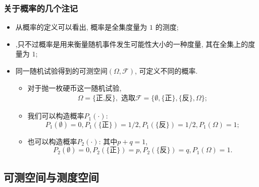 \documentclass[Prob-All.tex]{subfiles}
\begin{document}
\begin{frame}
	\frametitle{关于概率的几个注记}
	\begin{itemize}[<+-|alert@+>]
		\item 从概率的定义可以看出, 概率是全集度量为 $1$ 的测度;
		\item {},只不过概率是用来衡量随机事件发生可能性大小的一种度量, 其在全集上的度量为 $1$;
		\item 同一随机试验得到的可测空间$(\Omega,\mathcal{F})$, 可定义不同的概率.
		\begin{itemize}[<+-|alert@+>]
			\item 对于抛一枚硬币这一随机试验,
			\begin{eqnarray*}
				\Omega=\{\mbox{正,反}\}, \mbox{ 选取} \mathcal{F}=\{\emptyset, \{\mbox{正}\}, \{\mbox{反}\}, \Omega\};
			\end{eqnarray*}
			\item 我们可以构造概率$P_1(\cdot)$:
			\[P_1(\emptyset)=0, P_1(\{\mbox{正}\})=1/2,  P_1(\{\mbox{反}\})=1/2,  P_1(\Omega)=1;\]
			\item 也可以构造概率$P_2(\cdot)$: 其中$p+q=1$,
			\[P_2(\emptyset)=0, P_2(\{\mbox{正}\})=p,  P_2(\{\mbox{反}\})=q,  P_1(\Omega)=1.\]
		\end{itemize}

	\end{itemize}
\end{frame}





\subsection{可测空间与测度空间}
\end{document}
